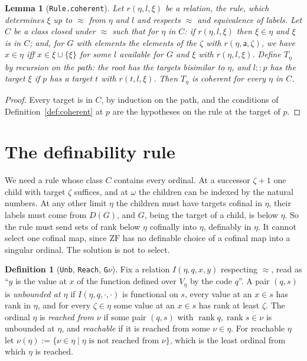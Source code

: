 \documentclass[10pt]{article}
\newtheorem{lemma}[theorem]{Lemma}
\theoremstyle{definition}
\newtheorem{definition}[theorem]{Definition}
\theoremstyle{remark}
\newcommand{\ZF}{\mathrm{ZF}}
\newcommand{\rk}{\operatorname{rank}}
\newcommand{\la}{\mathsf{a}}
\newcommand{\lean}[1]{\texttt{#1}}
\begin{document}
\begin{lemma}[\lean{Rule.coherent}]\label{lem:rule}
Let $r(\eta,l,\xi)$ be a relation, the \emph{rule}, which determines $\xi$ up
to $\approx$ from $\eta$ and $l$ and respects $\approx$ and equivalence of labels. Let
$C$ be a class closed under $\approx$ such that for $\eta$ in $C$: if $r(\eta,l,\xi)$
then $\xi\in\eta$ and $\xi$ is in $C$; and, for $G$ with elements the
elements of the $\zeta$ with $r(\eta,\la,\zeta)$, we have $x\in\eta$ iff
$x\in\xi\cup\{\xi\}$ for some $l$ available for $G$ and $\xi$ with $r(\eta,l,\xi)$.
Define $T_\eta$ by recursion on the path: the root has the targets
bisimilar to $\eta$, and $l::p$ has the target $\xi$ if $p$ has a target $t$
with $r(t,l,\xi)$. Then $T_\eta$ is coherent for every $\eta$ in $C$.
\end{lemma}
\begin{proof}
Every target is in $C$, by induction on the path, and the conditions of
Definition~\ref{def:coherent} at $p$ are the hypotheses on the rule at the
target of $p$.
\end{proof}

\section{The definability rule}\label{sec:rule}

We need a rule whose class $C$ contains every ordinal. At a successor
$\zeta+1$ one child with target $\zeta$ suffices, and at $\omega$ the children can
be indexed by the natural numbers. At any other limit $\eta$ the children
must have targets cofinal in $\eta$, their labels must come from $D(G)$,
and $G$, being the target of a child, is below $\eta$. So the rule must
send sets of rank below $\eta$ cofinally into $\eta$, definably in $\eta$. It
cannot select one cofinal map, since $\ZF$ has no definable choice of a
cofinal map into a singular ordinal. The solution is not to select.

\begin{definition}[\lean{Unb}, \lean{Reach}, \lean{G$\nu$}]
Fix a relation $I(\eta,q,x,y)$ respecting $\approx$, read as ``$y$ is the value
at $x$ of the function defined over $V_\eta$ by the code $q$''. A pair
$(q,s)$ is \emph{unbounded at $\eta$} if $I(\eta,q,\cdot,\cdot)$ is functional on
$s$, every value at an $x\in s$ has rank in $\eta$, and for every $\zeta\in\eta$
some value at an $x\in s$ has rank at least $\zeta$. The ordinal $\eta$ is
\emph{reached from $\nu$} if some pair $(q,s)$ with $\rk q,\rk s\in\nu$ is
unbounded at $\eta$, and \emph{reachable} if it is reached from some
$\nu\in\eta$. For reachable $\eta$ let
$\nu(\eta):=\{\nu\in\eta\mid\eta\text{ is not reached from }\nu\}$, which is the
least ordinal from which $\eta$ is reached.
\end{definition}
\end{document}

